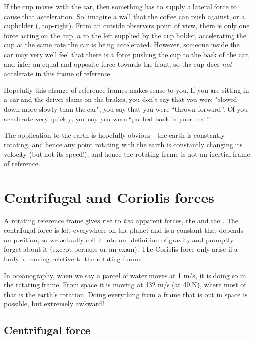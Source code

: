 If the cup moves with the car, then something has to supply a lateral force to cause that acceleration.  So, imagine a wall that the coffee can push against, or a cupholder (, top-right).  From an outside observers point of view, there is only one force acting on the cup, $a$ to the left supplied by the cup holder, accelerating the cup at the same rate the car is being accelerated.  However, someone inside the car may very well feel that there is a force pushing the cup to the back of the car, and infer an equal-and-opposite force towards the front, so the cup does \emph{not} accelerate in this frame of reference.  

Hopefully this change of reference frames makes sense to you.  If you are sitting in a car and the driver slams on the brakes, you don't say that you were "slowed down more slowly than the car", you say that you were ``thrown forward''.  Of you accelerate very quickly, you say you were ``pushed back in your seat''.  

The application to the earth is hopefully obvious - the earth is constantly rotating, and hence any point rotating with the earth is constantly changing its velocity (but not its speed!), and hence the rotating frame is not an inertial frame of reference.  

\section{Centrifugal and Coriolis forces}

 A rotating reference frame gives rise to \emph{two} apparent forces, the  and the .  The centrifugal force is felt everywhere on the planet and is a constant that depends on position, so we actually roll it into our definition of gravity and promptly forget about it (except perhaps on an exam).  The Coriolis force only arise if a body is moving relative to the rotating frame.  
 
 In oceanography, when we say a parcel of water moves at 1 m/s, it is doing so in the rotating frame.  From space it is moving at 132 m/s (at 49 N), where most of that is the earth's rotation.  Doing everything from a frame that is out in space is possible, but extremely awkward!
 
 \subsection{Centrifugal force}

